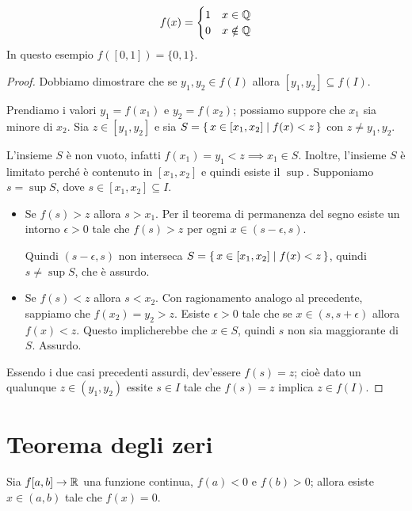 \begin{example}
\begin{equation*}
f(x) = \begin{cases}
1 & x \in \mathbb Q \\
0 & x \notin \mathbb Q
\end{cases}
\end{equation*}
In questo esempio $f([0,1]) = \{0, 1\}$.
\end{example}

\begin{proof}
Dobbiamo dimostrare che se $y_1, y_2 \in f(I)$ allora $[y_1, y_2] \subseteq f(I)$. 

Prendiamo i valori $y_1 = f(x_1)$ e $y_2 = f(x_2)$; possiamo suppore che $x_1$ sia minore di $x_2$. Sia $z \in [y_1, y_2]$ e sia $S = \set{x \in [x_1, x_2] | f(x) < z}$ con $z \neq y_1, y_2$.

L'insieme $S$ è non vuoto, infatti $f(x_1) = y_1 < z \implies x_1 \in S$. Inoltre, l'insieme $S$ è limitato perché è contenuto in $[x_1, x_2]$ e quindi esiste il $\sup$. Supponiamo $s = \sup S$, dove $s \in [x_1, x_2] \subseteq I$.

\begin{itemize}
\item Se $f(s) > z$ allora $s > x_1$. Per il teorema di permanenza del segno esiste un intorno $\epsilon > 0$ tale che $f(s) > z$ per ogni $x \in (s - \epsilon, s)$.

Quindi $(s-\epsilon, s)$ non interseca $S = \set{x \in [x_1, x_2] | f(x) < z}$, quindi $s \neq \sup S$, che è assurdo.

\item Se $f(s) < z$ allora $s < x_2$. Con ragionamento analogo al precedente, sappiamo che $f(x_2) = y_2 > z$. Esiste $\epsilon > 0$ tale che se $x \in (s, s+\epsilon)$ allora $f(x) < z$. Questo implicherebbe che $x \in S$, quindi $s$ non sia maggiorante di $S$. Assurdo.
\end{itemize}

Essendo i due casi precedenti assurdi, dev'essere $f(s) = z$; cioè dato un qualunque $z \in (y_1, y_2)$ essite $s \in I$ tale che $f(s) = z$ implica $z \in f(I)$.

\end{proof}

\section{Teorema degli zeri}
\begin{theorem}
Sia $f [a,b] \to \mathbb R$ una funzione continua, $f(a) < 0$ e $f(b) > 0$; allora esiste $x \in (a, b)$ tale che $f(x) = 0$.
\end{theorem}

